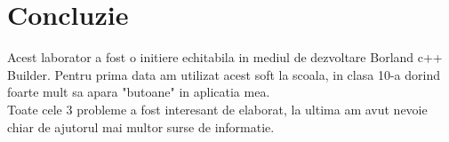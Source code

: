 \section*{Concluzie}

Acest laborator a fost o initiere echitabila in mediul de dezvoltare Borland c++ Builder. Pentru prima data am utilizat acest soft la scoala, in clasa 10-a dorind foarte mult sa apara "butoane" in aplicatia mea.
\\
Toate cele 3 probleme a fost interesant de elaborat, la ultima am avut nevoie chiar de ajutorul mai multor surse de informatie.

\clearpage